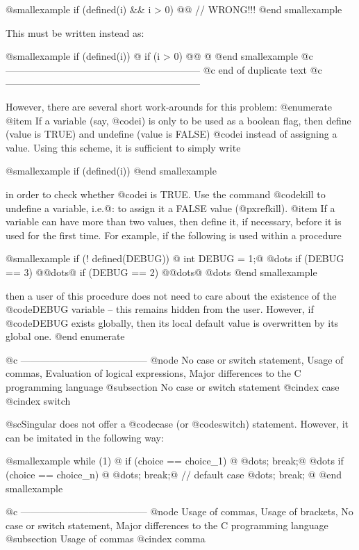 @smallexample
if (defined(i) && i > 0) @{@} // WRONG!!!
@end smallexample

This must be written instead as:

@smallexample
if (defined(i))
@{
  if (i > 0) @{@}
@}
@end smallexample
@c ------------------------------------------------------------
@c end of duplicate text
@c ------------------------------------------------------------

However, there are several short work-arounds for this problem:
@enumerate
@item
If a variable (say, @code{i}) is only to be used as a boolean flag, then
define (value is TRUE) and undefine (value is FALSE) @code{i} instead of
assigning a value. Using this scheme, it is sufficient to simply write

@smallexample
if (defined(i))
@end smallexample

in order to check whether @code{i} is TRUE. Use the command @code{kill}
to undefine a variable, i.e.@: to assign it a FALSE value (@pxref{kill}).
@item
If a variable  can have more than two values, then
define it, if necessary, before it is used for the first time.
For example, if the following is used within a procedure

@smallexample
if (! defined(DEBUG)) @{ int DEBUG = 1;@}
@dots{}
if (DEBUG == 3)  @{@dots{}@}
if (DEBUG == 2)  @{@dots{}@}
@dots{}
@end smallexample

then a user of this procedure does not need to care about the existence
of the @code{DEBUG} variable -- this remains hidden from the
user. However, if @code{DEBUG} exists globally, then its local default
value is overwritten by its global one.
@end enumerate

@c ---------------------------------------
@node No case or switch statement,  Usage of commas, Evaluation of logical expressions, Major differences to the C programming language
@subsection No case or switch statement
@cindex case
@cindex switch

@sc{Singular} does not offer a @code{case} (or @code{switch})
statement. However, it can be imitated in the following way:

@smallexample
while (1)
@{
   if (choice == choice_1) @{ @dots{}; break;@}
   @dots{}
   if (choice == choice_n) @{ @dots{}; break;@}
   // default case
   @dots{}; break;
@}
@end smallexample

@c ---------------------------------------
@node Usage of commas, Usage of brackets, No case or switch statement, Major differences to the C programming language
@subsection Usage of commas
@cindex comma

